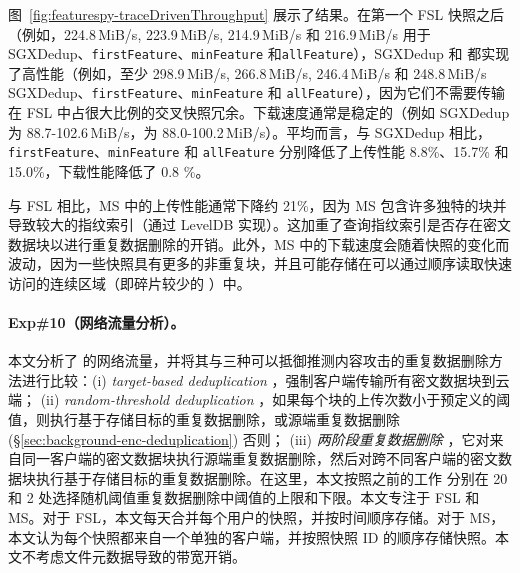 图~\ref{fig:featurespy-traceDrivenThroughput} 展示了结果。在第一个 FSL 快照之后（例如，224.8\,MiB/s, 223.9\,MiB/s, 214.9\,MiB/s 和 216.9\,MiB/s 用于 SGXDedup、{\tt firstFeature}、{\tt minFeature} 和{\tt allFeature}），SGXDedup 和 \prototype 都实现了高性能（例如，至少 298.9\,MiB/s, 266.8\,MiB/s, 246.4\,MiB/s 和 248.8\,MiB/s SGXDedup、{\tt firstFeature}、{\tt minFeature} 和 {\tt allFeature}），因为它们不需要传输在 FSL 中占很大比例的交叉快照冗余。下载速度通常是稳定的（例如 SGXDedup 为 88.7-102.6\,MiB/s，\prototype 为 88.0-100.2\,MiB/s）。平均而言，与 SGXDedup 相比，{\tt firstFeature}、{\tt minFeature} 和 {\tt allFeature} 分别降低了上传性能 8.8\%、15.7\% 和 15.0\%，下载性能降低了 0.8 \%。

与 FSL 相比，MS 中的上传性能通常下降约 21\%，因为 MS 包含许多独特的块并导致较大的指纹索引（通过 LevelDB \cite{leveldb} 实现）。这加重了查询指纹索引是否存在密文数据块以进行重复数据删除的开销。此外，MS 中的下载速度会随着快照的变化而波动，因为一些快照具有更多的非重复块，并且可能存储在可以通过顺序读取快速访问的连续区域（即碎片较少的 \cite{lillibridge13}）中。


\paragraph*{Exp\#10（网络流量分析）。}
本文分析了 \prototype 的网络流量，并将其与三种可以抵御推测内容攻击的重复数据删除方法进行比较：(i) {\em target-based deduplication} \cite{harnik2010side}，强制客户端传输所有密文数据块到云端； (ii) {\em random-threshold deduplication} \cite{harnik2010side}，如果每个块的上传次数小于预定义的阈值，则执行基于存储目标的重复数据删除，或源端重复数据删除 (\S\ref{sec:background-enc-deduplication}) 否则； (iii) {\em 两阶段重复数据删除} \cite{li15}，它对来自同一客户端的密文数据块执行源端重复数据删除，然后对跨不同客户端的密文数据块执行基于存储目标的重复数据删除。在这里，本文按照之前的工作 \cite{harnik2010side} 分别在 20 和 2 处选择随机阈值重复数据删除中阈值的上限和下限。本文专注于 FSL 和 MS。对于 FSL，本文每天合并每个用户的快照，并按时间顺序存储。对于 MS，本文认为每个快照都来自一个单独的客户端，并按照快照 ID 的顺序存储快照。本文不考虑文件元数据导致的带宽开销。

